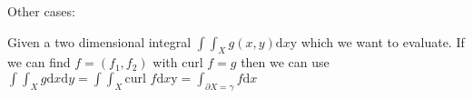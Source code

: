 Other cases:
\begin{compactitem}
    \item Given a two dimensional integral $\int\int_X g(x, y) \mathrm{d}x\mathrm{y}$ which we want to evaluate. If we can find $f = (f_1, f_2)$ with $\text{curl }f = g$ then we can use $\int\int_X g \mathrm{d}x\mathrm{d}y = \int\int_X \text{curl }f \mathrm{d}x\mathrm{y} = \int_{\partial X = \gamma} f \mathrm{d} x$
\end{compactitem}
